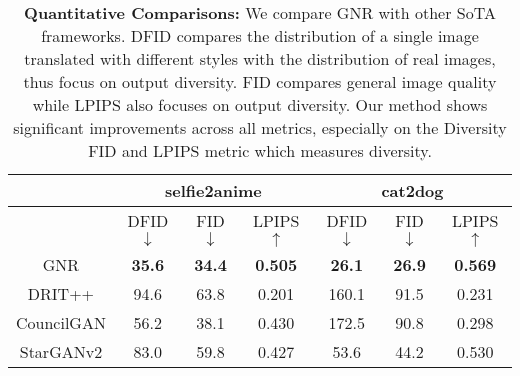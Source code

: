 \begin{table*}[]
\centering
\begin{tabular}{c|c|c|c|c|c|c}
    &\multicolumn{3}{c}{selfie2anime} &\multicolumn{3}{c}{cat2dog} \\
     \hline
    & DFID $\downarrow$ &FID $\downarrow$ & LPIPS $\uparrow$  & DFID $\downarrow$ &FID $\downarrow$ & LPIPS $\uparrow$ \\ \hline
    GNR        & \textbf{35.6} & \textbf{34.4} &\textbf{0.505} & \textbf{26.1}  &\textbf{26.9} & \textbf{0.569} \\ \hline
    DRIT++     & 94.6 & 63.8 & 0.201 & 160.1 &91.5 & 0.231 \\ \hline
    CouncilGAN & 56.2 & 38.1 & 0.430 & 172.5 & 90.8 & 0.298\\ \hline
    StarGANv2  & 83.0 & 59.8 & 0.427 & 53.6 & 44.2 & 0.530\\ 
\end{tabular}
\caption{\textbf{Quantitative Comparisons:} We compare GNR with other SoTA frameworks. DFID compares the distribution of a single image translated with different styles with the distribution of real images, thus focus on output diversity. FID compares general image quality while LPIPS also focuses on output diversity. Our method shows significant improvements across all metrics, especially on the Diversity FID and LPIPS metric which measures diversity.}
\label{tab:fid}
\end{table*}

